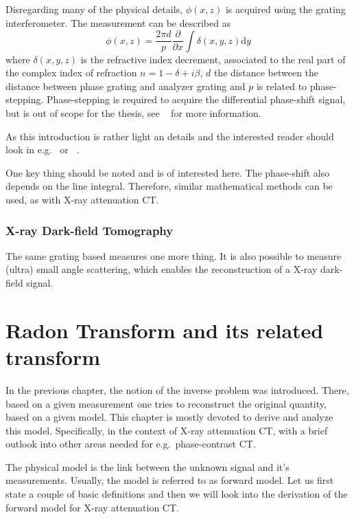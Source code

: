 
Disregarding many of the physical details, \(\phi(x, z)\) is acquired using the grating
interferometer. The measurement can be described as
\[ \phi(x, z) = \frac{2\pi d}{p} \frac{\partial}{\partial x}\int \delta(x, y, z)\mathrm{d}y\]
where \(\delta (x, y, z)\) is the refractive index decrement, associated to the real part of the
complex index of refraction \(n = 1 − \delta + i\beta\), \(d\) the distance between the distance
between phase grating and analyzer grating and \(p\) is related to phase-stepping. Phase-stepping is
required to acquire the differential phase-shift signal, but is out of scope for the thesis, see
~\cite{weitkamp_x-ray_2005} for more information.

As this introduction is rather light an details and the interested reader should look in
e.g.~\cite{teuffenbach_grating-based_2017} or ~\cite{hahn_statistical_2014}. 


One key thing should be noted and is of interested here. The phase-shift also depends on the line
integral. Therefore, similar mathematical methods can be used, as with X-ray attenuation CT\@.


\subsection{X-ray Dark-field Tomography}\label{sec:directional_darkfield}

The same grating based measures one more thing. It is also possible to measure (ultra) small angle
scattering, which enables the reconstruction of a X-ray dark-field signal.


\chapter{Radon Transform and its related transform}\label{chap:radon_transform_and_related}

In the previous chapter, the notion of the inverse problem was introduced. There, based on a given
measurement one tries to reconstruct the original quantity, based on a given model. This chapter is
mostly devoted to derive and analyze this model. Specifically, in the context of X-ray attenuation
CT, with a brief outlook into other areas needed for e.g.\ phase-contrast CT\@.

The physical model is the link between the unknown signal and it's measurements. Usually, the model
is referred to as forward model. Let us first state a couple of basic definitions and then we will
look into the derivation of the forward model for X-ray attenuation CT\@.

